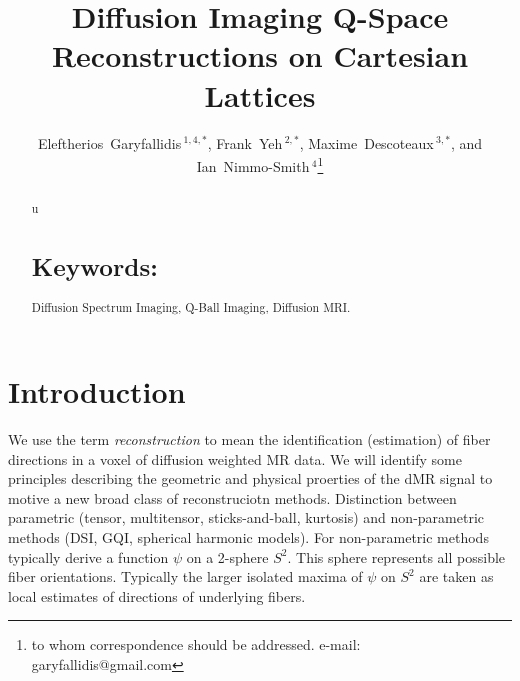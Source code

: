 \documentclass{bioinfo}
\begin{document}

\title[EIT]{Diffusion Imaging Q-Space Reconstructions on Cartesian Lattices}

\author[Garyfallidis, Yeh and
Nimmo-Smith]{Eleftherios~Garyfallidis\,$^{1,4,*}$, Frank~Yeh\,$^{2,*}$, Maxime~Descoteaux\,$^{3,*}$, and
  Ian~Nimmo-Smith\,$^{4}$\footnote{to whom correspondence should be
    addressed. e-mail: garyfallidis@gmail.com}}

\address{\,$^{1}$Wolfson College, University of Cambridge, Cambridge, UK\\
  \,$^{2}$Carnegie~Mellon, Pittsburgh.\\
  \,$^{3}$University of Sherbrooke, Canada.\\
  \,$^{4}$MRC Cognition and Brain Sciences Unit, Cambridge, UK.\\}

\history{}

\editor{}

\maketitle

\begin{abstract}
\noindent
u
\section{Keywords:} Diffusion Spectrum Imaging, Q-Ball Imaging,
Diffusion MRI.

\end{abstract}

\section{Introduction}

We use the term \emph{reconstruction} to mean the identification
(estimation) of fiber directions in a voxel of diffusion weighted MR
data. We will identify some principles describing the geometric and
physical proerties of the dMR signal to motive a new broad class of
reconstruciotn methods. Distinction between parametric (tensor,
multitensor, sticks-and-ball, kurtosis) and non-parametric methods (DSI,
GQI, spherical harmonic models). For non-parametric methods typically
derive a function $\psi$ on a 2-sphere $S^2$. This sphere represents all
possible fiber orientations. Typically the larger isolated maxima of
$\psi$ on $S^2$ are taken as local estimates of directions of underlying
fibers.
\end{document}
